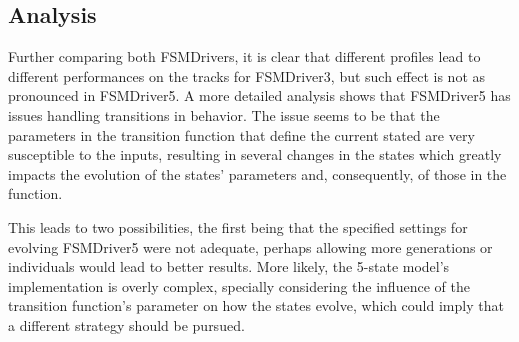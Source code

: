 

\subsection{Analysis}
Further comparing both FSMDrivers, it is clear that different profiles lead to different performances on the tracks for FSMDriver3, but such effect is not as pronounced in FSMDriver5. A more detailed analysis shows that FSMDriver5 has issues handling transitions in  behavior. The issue seems to be that the parameters  in the transition function that define the current stated are very susceptible to the inputs, resulting in several changes in the states which greatly impacts the evolution of the states' parameters and, consequently, of those in the function.

This leads to two possibilities, the first being that the specified settings for evolving FSMDriver5 were not adequate, perhaps allowing more generations or individuals would lead to better results. More likely, the 5-state model's implementation is overly complex, specially considering the influence of the transition function's parameter  on how the states evolve, which could imply that a different strategy should be pursued.